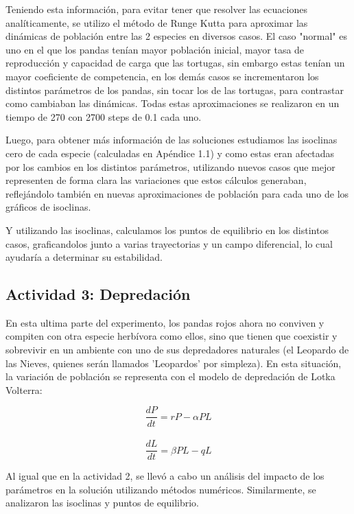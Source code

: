 \documentclass{article}
\begin{document}
\noindent Teniendo esta información, para evitar tener que resolver las ecuaciones analíticamente, se utilizo el método de Runge Kutta para aproximar las dinámicas de población entre las 2 especies en diversos casos. El caso "normal" es uno en el que los pandas tenían mayor población inicial, mayor tasa de reproducción y capacidad de carga que las tortugas, sin embargo estas tenían un mayor coeficiente de competencia, en los demás casos se incrementaron los distintos parámetros de los pandas, sin tocar los de las tortugas, para contrastar como cambiaban las dinámicas. Todas estas aproximaciones se realizaron en un tiempo de 270 con 2700 steps de 0.1 cada uno.
\vspace{1\baselineskip}

\noindent Luego, para obtener más información de las soluciones estudiamos las isoclinas cero de cada especie (calculadas en Apéndice 1.1) y como estas eran afectadas por los cambios en los distintos parámetros, utilizando nuevos casos que mejor representen de forma clara las variaciones que estos cálculos generaban, reflejándolo también en nuevas aproximaciones de población para cada uno de los gráficos de isoclinas. \vspace{1\baselineskip}

\noindent Y utilizando las isoclinas, calculamos los puntos de equilibrio en los distintos casos, graficandolos junto a varias trayectorias y un campo diferencial, lo cual ayudaría a determinar su estabilidad.



\subsection*{Actividad 3: Depredación}
\noindent En esta ultima parte del experimento, los pandas rojos ahora no conviven y compiten con otra especie herbívora como ellos, sino que tienen que coexistir y sobrevivir en un ambiente con uno de sus depredadores naturales (el Leopardo de las Nieves, quienes serán llamados 'Leopardos' por simpleza). En esta situación, la variación de población se representa con el modelo de depredación de Lotka Volterra:
\vspace{0.5\baselineskip}

\setlength{\baselineskip}{1\baselineskip}
\[\frac{dP}{dt} = rP - \alpha PL \]\\
\[\frac{dL}{dt} = \beta PL - qL\]
\vspace{0.75\baselineskip}

\noindent Al igual que en la actividad 2, se llevó a cabo un análisis del impacto de los parámetros en la solución utilizando métodos numéricos. Similarmente, se analizaron las isoclinas y puntos de equilibrio. \vspace{1\baselineskip}
\end{document}
